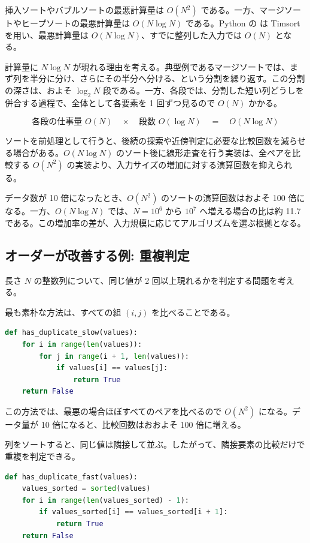 挿入ソートやバブルソートの最悪計算量は $O(N^2)$ である。一方、マージソートやヒープソートの最悪計算量は $O(N \log N)$ である。Python の  は Timsort を用い、最悪計算量は $O(N \log N)$、すでに整列した入力では $O(N)$ となる。

計算量に \(N \log N\) が現れる理由を考える。典型例であるマージソートでは、まず列を半分に分け、さらにその半分へ分ける、という分割を繰り返す。この分割の深さは、およそ \(\log_2 N\) 段である。一方、各段では、分割した短い列どうしを併合する過程で、全体として各要素を 1 回ずつ見るので \(O(N)\) かかる。

\[
\text{各段の仕事量 } O(N)
\quad \times \quad
\text{段数 } O(\log N)
\quad = \quad
O(N \log N)
\]

ソートを前処理として行うと、後続の探索や近傍判定に必要な比較回数を減らせる場合がある。$O(N \log N)$ のソート後に線形走査を行う実装は、全ペアを比較する $O(N^2)$ の実装より、入力サイズの増加に対する演算回数を抑えられる。

データ数が 10 倍になったとき、$O(N^2)$ のソートの演算回数はおよそ 100 倍になる。一方、$O(N \log N)$ では、$N=10^6$ から $10^7$ へ増える場合の比は約 11.7 である。この増加率の差が、入力規模に応じてアルゴリズムを選ぶ根拠となる。

\subsection{オーダーが改善する例: 重複判定}

長さ $N$ の整数列について、同じ値が 2 回以上現れるかを判定する問題を考える。

最も素朴な方法は、すべての組 $(i, j)$ を比べることである。

\begin{lstlisting}[language=Python]
def has_duplicate_slow(values):
    for i in range(len(values)):
        for j in range(i + 1, len(values)):
            if values[i] == values[j]:
                return True
    return False
\end{lstlisting}

この方法では、最悪の場合ほぼすべてのペアを比べるので $O(N^2)$ になる。データ量が 10 倍になると、比較回数はおおよそ 100 倍に増える。

列をソートすると、同じ値は隣接して並ぶ。したがって、隣接要素の比較だけで重複を判定できる。

\begin{lstlisting}[language=Python]
def has_duplicate_fast(values):
    values_sorted = sorted(values)
    for i in range(len(values_sorted) - 1):
        if values_sorted[i] == values_sorted[i + 1]:
            return True
    return False
\end{lstlisting}

